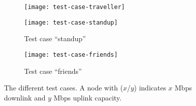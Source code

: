 \begin{figure}
    \begin{subfigure}{\textwidth}
        \centering
        \texttt{[image: test-case-traveller]}
        \label{fig:test-case-traveller}
    \end{subfigure}

    \begin{subfigure}{\textwidth}
        \centering
        \texttt{[image: test-case-standup]}
        \caption{Test case ``standup''}\label{fig:test-case-standup}
    \end{subfigure}

    \begin{subfigure}{\textwidth}
        \centering
        \texttt{[image: test-case-friends]}
        \caption{Test case ``friends''}\label{fig:test-case-friends}
    \end{subfigure}
    \caption{The different test cases. A node with ($x$/$y$) indicates $x$ Mbps downlink and $y$ Mbps uplink capacity.}
    \label{fig:test-cases}
\end{figure}
